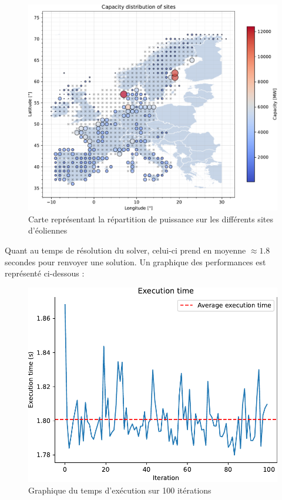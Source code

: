 \documentclass{article}
\newlength{\temp}
\begin{document}
\begin{figure}[h!]
    \centering
    \includegraphics[scale=0.4]{Images/Partie_1/Q1/capacity_distribution.pdf}
    \caption{Carte représentant la répartition de puissance sur les différents sites d'éoliennes}
    \label{fig:capacity_distribution_partie1}
\end{figure}


Quant au temps de résolution du solver, celui-ci prend en moyenne $\approx 1.8$ secondes pour renvoyer une solution. Un graphique des performances est représenté ci-dessous :

\begin{figure}[h!]
    \centering
    \includegraphics[scale=0.5]{Images/Partie_1/Q1/execution_time.pdf}
    \caption{Graphique du temps d'exécution sur 100 itérations}
    \label{fig:execution_time_partie1}
\end{figure}
\end{document}
